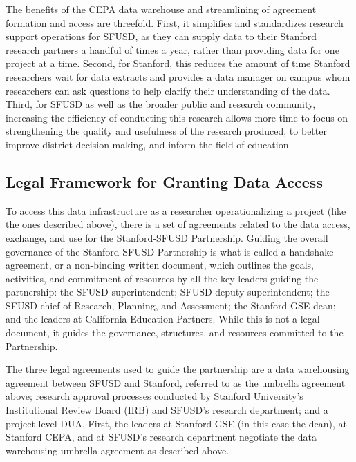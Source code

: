 The benefits of the CEPA data warehouse and streamlining of agreement formation and access are threefold. First, it simplifies and standardizes research support operations for SFUSD, as they can supply data to their Stanford research partners a handful of times a year, rather than providing data for one project at a time. Second, for Stanford, this reduces the amount of time Stanford researchers wait for data extracts and provides a data manager on campus whom researchers can ask questions to help clarify their understanding of the data. Third, for SFUSD as well as the broader public and research community, increasing the efficiency of conducting this research allows more time to focus on strengthening the quality and usefulness of the research produced, to better improve district decision-making, and inform the field of education.

\hypertarget{legal-framework-for-granting-data-access-4}{%
\subsection{Legal Framework for Granting Data Access}\label{legal-framework-for-granting-data-access-4}}

To access this data infrastructure as a researcher operationalizing a project (like the ones described above), there is a set of agreements related to the data access, exchange, and use for the Stanford-SFUSD Partnership. Guiding the overall governance of the Stanford-SFUSD Partnership is what is called a handshake agreement, or a non-binding written document, which outlines the goals, activities, and commitment of resources by all the key leaders guiding the partnership: the SFUSD superintendent; SFUSD deputy superintendent; the SFUSD chief of Research, Planning, and Assessment; the Stanford GSE dean; and the leaders at California Education Partners. While this is not a legal document, it guides the governance, structures, and resources committed to the Partnership.

The three legal agreements used to guide the partnership are a data warehousing agreement between SFUSD and Stanford, referred to as the umbrella agreement above; research approval processes conducted by Stanford University's Institutional Review Board (IRB) and SFUSD's research department; and a project-level DUA. First, the leaders at Stanford GSE (in this case the dean), at Stanford CEPA, and at SFUSD's research department negotiate the data warehousing umbrella agreement as described above.

